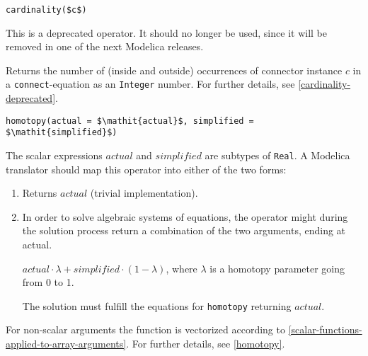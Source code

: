 \begin{operatordefinition}[cardinality]
\begin{synopsis}\begin{lstlisting}
cardinality($c$)
\end{lstlisting}\end{synopsis}
\begin{semantics}
\begin{nonnormative}
This is a deprecated operator.
It should no longer be used, since it will be removed in one of the next Modelica releases.
\end{nonnormative}
Returns the number of (inside and outside) occurrences of connector instance $c$ in a \lstinline!connect!-equation as an \lstinline!Integer! number.
For further details, see \cref{cardinality-deprecated}.
\end{semantics}
\end{operatordefinition}

\begin{operatordefinition}[homotopy]
\begin{synopsis}\begin{lstlisting}
homotopy(actual = $\mathit{actual}$, simplified = $\mathit{simplified}$)
\end{lstlisting}\end{synopsis}
\begin{semantics}
The scalar expressions $\mathit{actual}$ and $\mathit{simplified}$ are subtypes of \lstinline!Real!.
A Modelica translator should map this operator into either of the two forms:
\begin{enumerate}
\item
  Returns $\mathit{actual}$ (trivial implementation).
\item
  In order to solve algebraic systems of equations, the operator might during the solution process return a combination of the two arguments, ending at actual.
  \begin{example}
  $\mathit{actual} \cdot \lambda + \mathit{simplified} \cdot (1 - \lambda)$, where $\lambda$ is a homotopy parameter going from 0 to 1.
  \end{example}
  The solution must fulfill the equations for \lstinline!homotopy! returning $\mathit{actual}$.
\end{enumerate}
For non-scalar arguments the function is vectorized according to \cref{scalar-functions-applied-to-array-arguments}.
For further details, see \cref{homotopy}.
\end{semantics}
\end{operatordefinition}

